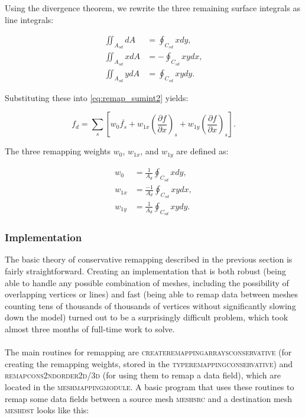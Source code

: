 \documentclass{article}
\begin{document}
Using the divergence theorem, we rewrite the three remaining surface integrals as line integrals:

\begin{align} \label{eq:remap_lineints}
\iint_{A_{sd}} dA &= \oint_{C_{sd}} x dy, \\
\iint_{A_{sd}} x dA &= - \oint_{C_{sd}} xy dx, \\
\iint_{A_{sd}} y dA &= \oint_{C_{sd}} xy dy.
\end{align}

Substituting these into \eqref{eq:remap_sumint2} yields:

\begin{equation} \label{eq:remap_remap}
f_d = \sum_s \left[ w_0 \overline{f_s} + w_{1x} {\left( \frac{\partial f}{\partial x} \right) }_s + 
w_{1y} {\left( \frac{\partial f}{\partial x} \right) }_s \right].
\end{equation}

The three remapping weights $w_0$, $w_{1x}$, and $w_{1y}$ are defined as:

\begin{align} \label{eq:remap_weights}
w_0 &= \frac{1}{A_d} \oint_{C_{sd}} x dy, \\
w_{1x} &= \frac{-1}{A_d} \oint_{C_{sd}} xy dx, \\
w_{1y} &= \frac{1}{A_d} \oint_{C_{sd}} xy dy.
\end{align}

\subsubsection{Implementation}

The basic theory of conservative remapping described in the previous section is fairly straightforward. Creating an implementation that is both robust (being able to handle any possible combination of meshes, including the possibility of overlapping vertices or lines) and fast (being able to remap data between meshes counting tens of thousands of thousands of vertices without significantly slowing down the model) turned out to be a surprisingly difficult problem, which took almost three months of full-time work to solve.\\
\\
The main routines for remapping are \textsc{create\textunderscore remapping\textunderscore arrays\textunderscore conservative} (for creating the remapping weights, stored in the \textsc{type\textunderscore remapping\textunderscore conservative}) and \textsc{remap\textunderscore cons\textunderscore 2nd\textunderscore order\textunderscore 2d/3d} (for using them to remap a data field), which are located in the \textsc{mesh\textunderscore mapping\textunderscore module}. A basic program that uses these routines to remap some data fields between a source mesh \textsc{mesh\textunderscore src} and a destination mesh \textsc{mesh\textunderscore dst} looks like this:
\end{document}
